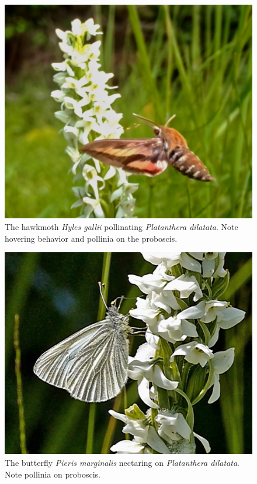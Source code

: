 \begin{multicols}{2}
\begin{figure}[H]
\begin{center}
\vspace{2mm}
\includegraphics[width=\textwidth]{img/Platanthera_dilatata_Hyles_galii.jpg}
\caption{The hawkmoth \emph{Hyles gallii} pollinating \emph{Platanthera dilatata}. Note hovering behavior and pollinia on the proboscis.}
\label{Platanthera_dilatata_Hyles_galii}
\end{center}
\end{figure}

\begin{figure}[H]
\begin{center}
\vspace{2mm}
\includegraphics[width=\textwidth]{img/Platanthera_dilatata_Pieris_marginalis.jpg}
\caption{The butterfly \emph{Pieris marginalis} nectaring on \emph{Platanthera dilatata}.  Note pollinia on proboscis.}
\label{Platanthera_dilatata_Pieris_marginalis}
\end{center}
\end{figure}



\end{multicols}
